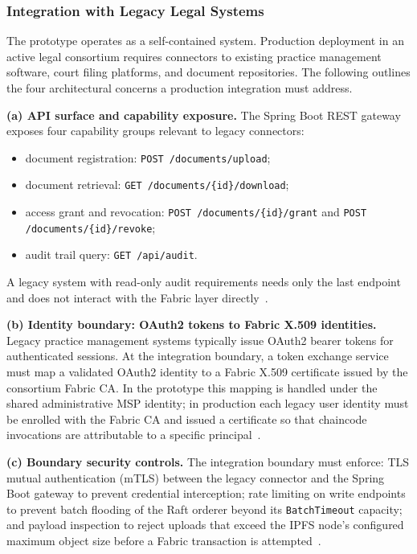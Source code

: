 \documentclass[preprint,12pt]{elsarticle}
\begin{document}
\subsubsection{Integration with Legacy Legal Systems}
The prototype operates as a self-contained system. Production
deployment in an active legal consortium requires connectors to
existing practice management software, court filing platforms, and
document repositories. The following outlines the four architectural
concerns a production integration must address.

\textbf{(a) API surface and capability exposure.} The Spring Boot
REST gateway exposes four capability groups relevant to legacy
connectors:
\begin{itemize}
\item document registration: \texttt{POST /documents/upload};
\item document retrieval: \texttt{GET /documents/\{id\}/download};
\item access grant and revocation: \texttt{POST
      /documents/\{id\}/grant} and \texttt{POST
      /documents/\{id\}/revoke};
\item audit trail query: \texttt{GET /api/audit}.
\end{itemize}
A legacy system with read-only audit
requirements needs only the last endpoint and does not interact with
the Fabric layer directly~\cite{springBoot325}.

\textbf{(b) Identity boundary: OAuth2 tokens to Fabric X.509
identities.} Legacy practice management systems typically issue
OAuth2 bearer tokens for authenticated sessions. At the integration
boundary, a token exchange service must map a validated OAuth2
identity to a Fabric X.509 certificate issued by the consortium
Fabric CA. In the prototype this mapping is handled under the shared
administrative MSP identity; in production each legacy user identity
must be enrolled with the Fabric CA and issued a certificate so that
chaincode invocations are attributable to a specific
principal~\cite{fabricCADoc,rfc7519jwt}.

\textbf{(c) Boundary security controls.} The integration boundary
must enforce: TLS mutual authentication (mTLS) between the legacy
connector and the Spring Boot gateway to prevent credential
interception; rate limiting on write endpoints to prevent batch
flooding of the Raft orderer beyond its \texttt{BatchTimeout}
capacity; and payload inspection to reject uploads that exceed the
IPFS node's configured maximum object size before a Fabric
transaction is attempted~\cite{nist80053}.
\end{document}
